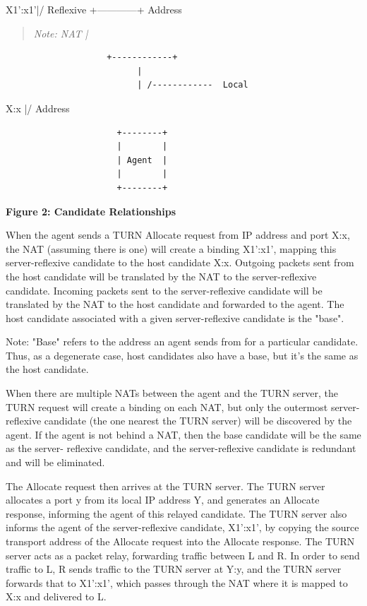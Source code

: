 \documentclass{article}
\begin{document}
X1':x1'|/               Reflexive +------------+         Address

\begin{quote}
\textit{Note: NAT     |}
\end{quote}

\begin{verbatim}
                    +------------+
                          |
                          | /------------  Local
\end{verbatim}

X:x |/               Address

\begin{verbatim}
                      +--------+
                      |        |
                      | Agent  |
                      |        |
                      +--------+
\end{verbatim}

\begin{center}
\textbf{Figure 2: Candidate Relationships}
\end{center}

When the agent sends a TURN Allocate request from IP address and port X:x, the NAT (assuming there is one) will create a binding X1':x1', mapping this server-reflexive candidate to the host candidate X:x. Outgoing packets sent from the host candidate will be translated by the NAT to the server-reflexive candidate.  Incoming packets sent to the server-reflexive candidate will be translated by the NAT to the host candidate and forwarded to the agent.  The host candidate associated with a given server-reflexive candidate is the "base".

Note: "Base" refers to the address an agent sends from for a particular candidate.  Thus, as a degenerate case, host candidates also have a base, but it's the same as the host candidate.

When there are multiple NATs between the agent and the TURN server, the TURN request will create a binding on each NAT, but only the outermost server-reflexive candidate (the one nearest the TURN server) will be discovered by the agent.  If the agent is not behind a NAT, then the base candidate will be the same as the server- reflexive candidate, and the server-reflexive candidate is redundant and will be eliminated.

The Allocate request then arrives at the TURN server.  The TURN server allocates a port y from its local IP address Y, and generates an Allocate response, informing the agent of this relayed candidate. The TURN server also informs the agent of the server-reflexive candidate, X1':x1', by copying the source transport address of the Allocate request into the Allocate response.  The TURN server acts as a packet relay, forwarding traffic between L and R.  In order to send traffic to L, R sends traffic to the TURN server at Y:y, and the TURN server forwards that to X1':x1', which passes through the NAT where it is mapped to X:x and delivered to L.
\end{document}
